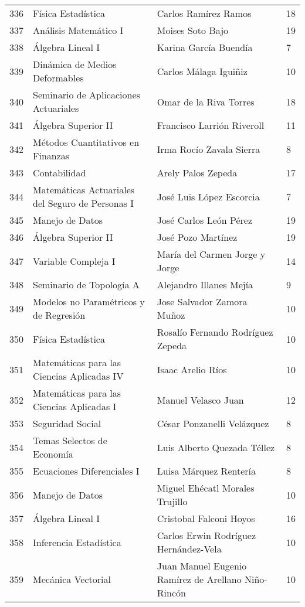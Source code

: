 \begin{table}[ht]
\begin{tabular}{rlll}
  336 & Física Estadística & Carlos Ramírez Ramos & 18 \\ 
  337 & Análisis Matemático I & Moises Soto Bajo & 19 \\ 
  338 & Álgebra Lineal I & Karina García Buendía & 7 \\ 
  339 & Dinámica de Medios Deformables & Carlos Málaga Iguiñiz & 10 \\ 
  340 & Seminario de Aplicaciones Actuariales & Omar de la Riva Torres & 18 \\ 
  341 & Álgebra Superior II & Francisco Larrión Riveroll & 11 \\ 
  342 & Métodos Cuantitativos en Finanzas & Irma Rocío Zavala Sierra & 8 \\ 
  343 & Contabilidad & Arely Palos Zepeda & 17 \\ 
  344 & Matemáticas Actuariales del Seguro de Personas I & José Luis López Escorcia & 7 \\ 
  345 & Manejo de Datos & José Carlos León Pérez & 19 \\ 
  346 & Álgebra Superior II & José Pozo Martínez & 19 \\ 
  347 & Variable Compleja I & María del Carmen Jorge y Jorge & 14 \\ 
  348 & Seminario de Topología A & Alejandro Illanes Mejía & 9 \\ 
  349 & Modelos no Paramétricos y de Regresión & Jose Salvador Zamora Muñoz & 10 \\ 
  350 & Física Estadística & Rosalío Fernando Rodríguez Zepeda & 10 \\ 
  351 & Matemáticas para las Ciencias Aplicadas IV & Isaac Arelio Ríos & 10 \\ 
  352 & Matemáticas para las Ciencias Aplicadas I & Manuel Velasco Juan & 12 \\ 
  353 & Seguridad Social & César Ponzanelli Velázquez & 8 \\ 
  354 & Temas Selectos de Economía & Luis Alberto Quezada Téllez & 8 \\ 
  355 & Ecuaciones Diferenciales I & Luisa Márquez Rentería & 8 \\ 
  356 & Manejo de Datos & Miguel Ehécatl Morales Trujillo & 10 \\ 
  357 & Álgebra Lineal I & Cristobal Falconi Hoyos & 16 \\ 
  358 & Inferencia Estadística & Carlos Erwin Rodríguez Hernández-Vela & 10 \\ 
  359 & Mecánica Vectorial & Juan Manuel Eugenio Ramírez de Arellano Niño-Rincón & 10 \\ 

\end{tabular}
\end{table}
